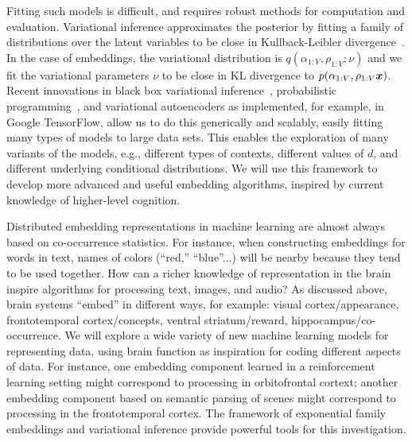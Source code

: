 Fitting such models is difficult, and requires robust methods for
computation and evaluation.  Variational inference approximates the
posterior by fitting a family of distributions over the latent
variables to be close in Kullback-Leibler
divergence~\citep{Jordan:1999,Blei:2017}.  In the case of embeddings,
the variational distribution is $q(\alpha_{1:V}, \rho_{1:V} ; \nu)$
and we fit the variational parameters $\nu$ to be close in KL
divergence to $p(\alpha_{1:V}, \rho_{1:V} \g \mbx)$.  Recent
innovations in black box variational inference~\citep{Ranganath:2014},
probabilistic programming~\citep{Kucukelbir:2017,Tran:2017}, and
variational autoencoders
\citep{kingma} as implemented, for example, in Google TensorFlow, allow us to do this generically and
scalably, easily fitting many types of models to large
data sets.  This enables the exploration of many variants of the
models, e.g., different types of contexts, different values of $d$,
and different underlying conditional distributions. We will use
this framework to develop more advanced and useful embedding
algorithms, inspired by current knowledge of higher-level cognition.


Distributed embedding representations in machine learning are almost
always based on co-occurrence statistics. For instance, when
constructing embeddings for words in text, names of colors (``red,''
``blue''...) will be nearby because they
tend to be used together. How can a richer knowledge of representation
in the brain inspire algorithms for processing text,
images, and audio? As discussed above, brain systems 
``embed'' in different ways, for example: visual cortex/appearance, frontotemporal
cortex/concepts, ventral striatum/reward, hippocampus/co-occurrence.
We will explore a wide variety of new machine learning models 
for representing data, using brain function as inspiration
for coding different aspects of data. For instance,
one embedding component learned in a reinforcement learning
setting might correspond to processing in orbitofrontal cortext;
another embedding component based on semantic parsing of scenes might correspond to processing in
the frontotemporal cortex. 
The framework of exponential family embeddings and variational
inference provide powerful tools for this investigation.

